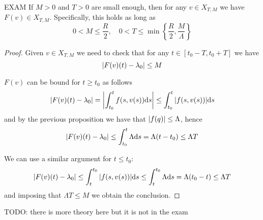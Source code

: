 \documentclass[12pt]{extarticle}
\begin{document}
\begin{proposition}{EXAM}{}
	If $M > 0$ and $T > 0$ are small enough, then for any $v \in X_{T, M}$ we have
	$F(v) \in X_{T, M}$.
	Specifically, this holds as long as
	\begin{equation}
		0 < M \leq \frac{R}{2}, \quad 0 < T \leq \min \left\{ \frac{R}{2}, \frac{M}{\Lambda} \right\}
	\end{equation}
\end{proposition}
\begin{proof}
	Given $v \in X_{T, M}$ we need to check that for any $t \in [t_0 - T, t_0 + T]$ we have
	\begin{equation}
		\abs{F(v)(t) - \lambda_0} \leq M
	\end{equation}

	$F(v)$ can be bound for $t \geq t_0$ as follows
	\begin{equation}
		\abs{F(v)(t) - \lambda_0} = \abs{\int_{t_0}^t f(s, v(s)) \dd s} \leq \int_{t_0}^t \abs{f(s, v(s))} \dd s
	\end{equation}
	and by the previous proposition we have that $\abs{f(q)} \leq \Lambda$, hence
	\begin{equation}
		\abs{F(v)(t)-\lambda_0} \leq \int_{t_0}^t \Lambda \dd s = \Lambda (t-t_0) \leq \Lambda T
	\end{equation}

	We can use a similar argument for $t \leq t_0$:
	\begin{equation}
		\abs{F(v)(t)-\lambda_0} \leq \int^{t_0}_t \abs{f(s, v(s))} \dd s \leq \int^{t_0}_t \Lambda \dd s = \Lambda (t_0-t) \leq \Lambda T
	\end{equation}
	and imposing that $\Lambda T \leq M$ we obtain the conclusion.
\end{proof}

TODO: there is more theory here but it is not in the exam
\end{document}
